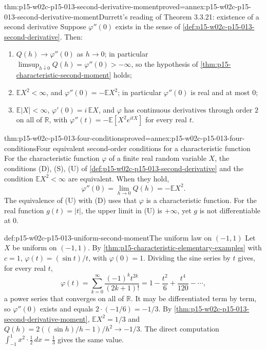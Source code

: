 \begin{hbtheorem}{thm:p15-w02c-p15-013-second-derivative-moment}{proved=annex:p15-w02c-p15-013-second-derivative-moment}{Durrett's reading of Theorem 3.3.21: existence of a second derivative}
Suppose \(\varphi''(0)\) exists in the sense of
\cref{def:p15-w02c-p15-013-second-derivative}. Then:
\begin{enumerate}
\item \(Q(h)\to\varphi''(0)\) as \(h\to0\); in particular
      \(\limsup_{h\downarrow0}Q(h)=\varphi''(0)>-\infty\), so the
      hypothesis of \cref{thm:p15-characteristic-second-moment} holds;
\item \(\mathbb EX^2<\infty\), and
      \(\varphi''(0)=-\mathbb EX^2\); in particular \(\varphi''(0)\) is real
      and at most \(0\);
\item \(\mathbb E|X|<\infty\), \(\varphi'(0)=i\,\mathbb EX\), and \(\varphi\)
      has continuous derivatives through order \(2\) on all of
      \(\mathbb R\), with
      \(\varphi''(t)=-\mathbb E[X^2e^{itX}]\) for every real \(t\).
\end{enumerate}
\end{hbtheorem}

\begin{hbcorollary}{thm:p15-w02c-p15-013-four-conditions}{proved=annex:p15-w02c-p15-013-four-conditions}{Four equivalent second-order conditions for a characteristic function}
For the characteristic function \(\varphi\) of a finite real random variable
\(X\), the conditions (D), (S), (U) of
\cref{def:p15-w02c-p15-013-second-derivative} and the condition
\(\mathbb EX^2<\infty\) are equivalent. When they hold,
\[
 \varphi''(0)=\lim_{h\to0}Q(h)=-\mathbb EX^2 .
\]
The equivalence of (U) with (D) uses that \(\varphi\) is a characteristic
function. For the real function \(g(t)=|t|\), the upper limit in (U) is
\(+\infty\), yet \(g\) is not differentiable at \(0\).
\end{hbcorollary}

\begin{hbexample}{def:p15-w02c-p15-013-uniform-second-moment}{The uniform law on \((-1,1)\)}
Let \(X\) be uniform on \((-1,1)\). By
\cref{thm:p15-characteristic-elementary-examples} with \(c=1\),
\(\varphi(t)=(\sin t)/t\), with \(\varphi(0)=1\). Dividing the sine series
by \(t\) gives, for every real \(t\),
\[
 \varphi(t)=\sum_{k=0}^{\infty}\frac{(-1)^k t^{2k}}{(2k+1)!}
           =1-\frac{t^2}{6}+\frac{t^4}{120}-\cdots,
\]
a power series that converges on all of \(\mathbb R\). It may be
differentiated term by term, so \(\varphi''(0)\) exists and equals
\(2\cdot(-1/6)=-1/3\). By
\cref{thm:p15-w02c-p15-013-second-derivative-moment},
\(\mathbb EX^2=1/3\) and \(Q(h)=2((\sin h)/h-1)/h^2\to-1/3\). The direct
computation \(\int_{-1}^{1}x^2\cdot\tfrac12\,dx=\tfrac13\) gives the same
value.
\end{hbexample}

